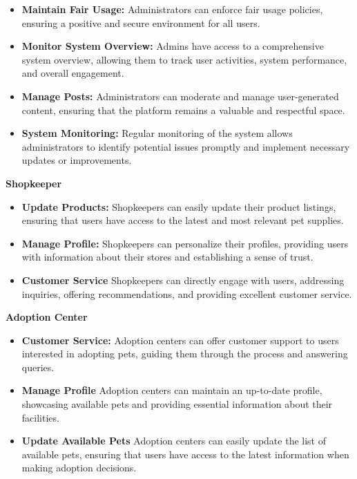 \begin{itemize}
    \item \textbf{Maintain Fair Usage:} Administrators can enforce fair usage policies, ensuring a positive and secure environment for all users.
    \item \textbf{Monitor System Overview:} Admins have access to a comprehensive system overview, allowing them to track user activities, system performance, and overall engagement.

    \item \textbf{Manage Posts:} Administrators can moderate and manage user-generated content, ensuring that the platform remains a valuable and respectful space.

    \item \textbf{System Monitoring:} Regular monitoring of the system allows administrators to identify potential issues promptly and implement necessary updates or improvements.

\end{itemize}

\textbf{Shopkeeper}
\begin{itemize}
    \item \textbf{Update Products:} Shopkeepers can easily update their product listings, ensuring that users have access to the latest and most relevant pet supplies.

    \item \textbf{Manage Profile:} Shopkeepers can personalize their profiles, providing users with information about their stores and establishing a sense of trust.

    \item\textbf{Customer Service} Shopkeepers can directly engage with users, addressing inquiries, offering recommendations, and providing excellent customer service. 
\end{itemize}


\textbf{Adoption Center}
\begin{itemize}
    \item \textbf{Customer Service:} Adoption centers can offer customer support to users interested in adopting pets, guiding them through the process and answering queries.
    \item \textbf{Manage Profile} Adoption centers can maintain an up-to-date profile, showcasing available pets and providing essential information about their facilities.
    \item \textbf{Update Available Pets} Adoption centers can easily update the list of available pets, ensuring that users have access to the latest information when making adoption decisions.
\end{itemize}